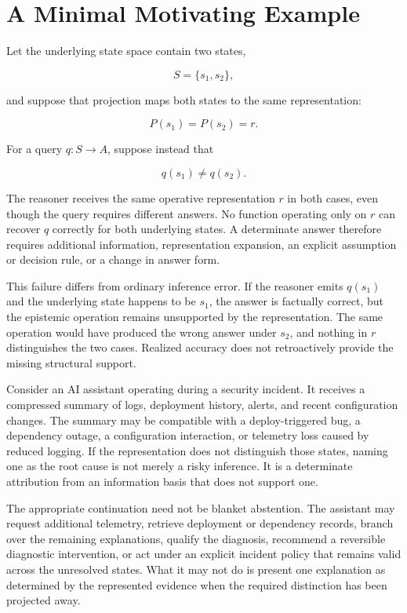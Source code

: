 \documentclass[11pt]{article}
\theoremstyle{definition}
\theoremstyle{remark}
\begin{document}
\section{A Minimal Motivating Example}

Let the underlying state space contain two states,

\[
S=\{s_1,s_2\},
\]

and suppose that projection maps both states to the same representation:

\[
P(s_1)=P(s_2)=r.
\]

For a query \(q:S\rightarrow A\), suppose instead that

\[
q(s_1)\neq q(s_2).
\]

The reasoner receives the same operative representation \(r\) in both cases, even though the query requires different answers. No function operating only on \(r\) can recover \(q\) correctly for both underlying states. A determinate answer therefore requires additional information, representation expansion, an explicit assumption or decision rule, or a change in answer form.

This failure differs from ordinary inference error. If the reasoner emits \(q(s_1)\) and the underlying state happens to be \(s_1\), the answer is factually correct, but the epistemic operation remains unsupported by the representation. The same operation would have produced the wrong answer under \(s_2\), and nothing in \(r\) distinguishes the two cases. Realized accuracy does not retroactively provide the missing structural support.

Consider an AI assistant operating during a security incident. It receives a compressed summary of logs, deployment history, alerts, and recent configuration changes. The summary may be compatible with a deploy-triggered bug, a dependency outage, a configuration interaction, or telemetry loss caused by reduced logging. If the representation does not distinguish those states, naming one as the root cause is not merely a risky inference. It is a determinate attribution from an information basis that does not support one.

The appropriate continuation need not be blanket abstention. The assistant may request additional telemetry, retrieve deployment or dependency records, branch over the remaining explanations, qualify the diagnosis, recommend a reversible diagnostic intervention, or act under an explicit incident policy that remains valid across the unresolved states. What it may not do is present one explanation as determined by the represented evidence when the required distinction has been projected away.
\end{document}
